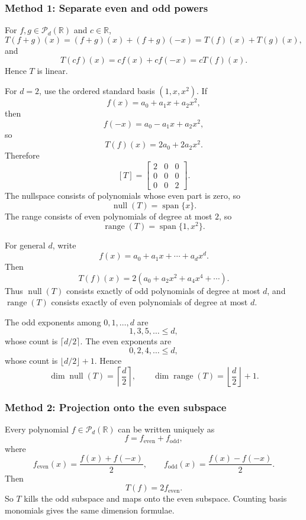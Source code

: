 \documentclass[12pt]{article}
\newcommand{\R}{\mathbb{R}}
\newcommand{\Ppoly}{\mathcal{P}}
\newcommand{\Null}{\operatorname{null}}
\newcommand{\Range}{\operatorname{range}}
\newcommand{\Span}{\operatorname{span}}
\begin{document}
\subsubsection{Method 1: Separate even and odd powers}
For $f,g\in\Ppoly_d(\R)$ and $c\in\R$,
\[
T(f+g)(x)=(f+g)(x)+(f+g)(-x)=T(f)(x)+T(g)(x),
\]
and
\[
T(cf)(x)=cf(x)+cf(-x)=cT(f)(x).
\]
Hence $T$ is linear.

For $d=2$, use the ordered standard basis $(1,x,x^2)$. If
\[
f(x)=a_0+a_1x+a_2x^2,
\]
then
\[
f(-x)=a_0-a_1x+a_2x^2,
\]
so
\[
T(f)(x)=2a_0+2a_2x^2.
\]
Therefore
\[
\boxed{[T]=\begin{bmatrix}2&0&0\\0&0&0\\0&0&2\end{bmatrix}.}
\]
The nullspace consists of polynomials whose even part is zero, so
\[
\boxed{\Null(T)=\Span\{x\}.}
\]
The range consists of even polynomials of degree at most $2$, so
\[
\boxed{\Range(T)=\Span\{1,x^2\}.}
\]

For general $d$, write
\[
f(x)=a_0+a_1x+\cdots+a_dx^d.
\]
Then
\[
T(f)(x)=2(a_0+a_2x^2+a_4x^4+\cdots).
\]
Thus $\Null(T)$ consists exactly of odd polynomials of degree at most $d$, and $\Range(T)$ consists exactly of even polynomials of degree at most $d$.

The odd exponents among $0,1,\ldots,d$ are
\[
1,3,5,\ldots\le d,
\]
whose count is $\lceil d/2\rceil$. The even exponents are
\[
0,2,4,\ldots\le d,
\]
whose count is $\lfloor d/2\rfloor+1$. Hence
\[
\boxed{\dim\Null(T)=\left\lceil\frac d2\right\rceil,
\qquad
\dim\Range(T)=\left\lfloor\frac d2\right\rfloor+1.}
\]

\subsubsection{Method 2: Projection onto the even subspace}
Every polynomial $f\in\Ppoly_d(\R)$ can be written uniquely as
\[
f=f_{\mathrm{even}}+f_{\mathrm{odd}},
\]
where
\[
f_{\mathrm{even}}(x)=\frac{f(x)+f(-x)}2,
\qquad
f_{\mathrm{odd}}(x)=\frac{f(x)-f(-x)}2.
\]
Then
\[
T(f)=2f_{\mathrm{even}}.
\]
So $T$ kills the odd subspace and maps onto the even subspace. Counting basis monomials gives the same dimension formulae.
\end{document}
